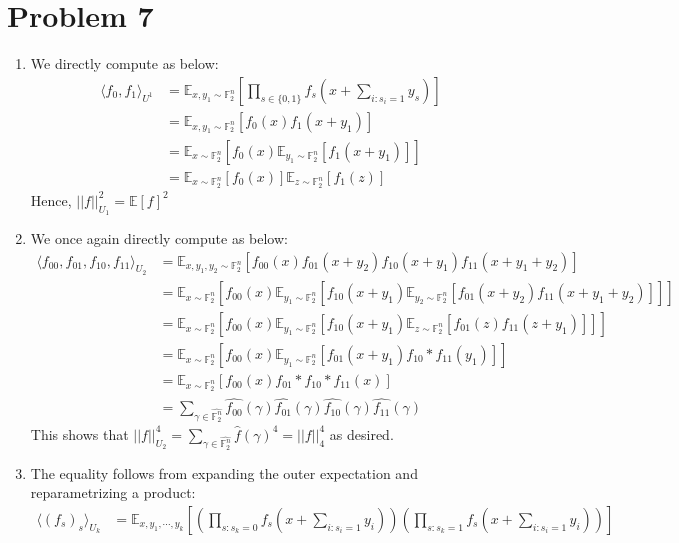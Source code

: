 \documentclass[12pt]{article}%
\newcommand{\Fn}{\mathbb{F}_2^n}
\newcommand{\Exp}[1]{\mathbb{E}_{#1}}
\begin{document}
\section*{Problem 7}
\begin{enumerate}
  \item We directly compute as below:
  \begin{align*}
    \langle f_0, f_1 \rangle_{U^1} & = \Exp{x, y_1 \sim \Fn}\left[ \prod_{s \in \{0,1\}} f_s(x + \sum_{i: s_i = 1} y_s) \right ] \\
    & = \Exp{x, y_1 \sim \Fn}\left[ f_0(x)f_1(x + y_1) \right] \\
    & = \Exp{x \sim \Fn} \left[f_0(x) \Exp{y_1 \sim \Fn} \left[f_1(x + y_1) \right]\right] \\
    & = \Exp{x \sim \Fn} \left[f_0(x) \right] \Exp{z \sim \Fn} \left[ f_1(z) \right]
  \end{align*}
  Hence, $||f||_{U_1}^2 = \mathbb{E}[f]^2$
  \item We once again directly compute as below:
  \begin{align*}
    \langle f_{00}, f_{01}, f_{10}, f_{11} \rangle_{U_2} & = \Exp{x, y_1, y_2 \sim \Fn}[f_{00}(x)f_{01}(x + y_2)f_{10}(x + y_1)f_{11}(x + y_1 + y_2)] \\
    & = \Exp{x \sim \Fn} \left[ f_{00}(x) \Exp{y_1 \sim \Fn} \left[ f_{10}(x + y_1) \Exp{y_2 \sim \Fn}\left[ f_{01}(x + y_2)f_{11}(x + y_1 + y_2)\right] \right] \right] \\
    & = \Exp{x \sim \Fn} \left[ f_{00}(x) \Exp{y_1 \sim \Fn} \left[ f_{10}(x + y_1) \Exp{z \sim \Fn}\left[ f_{01}(z)f_{11}(z + y_1)\right] \right] \right] \\
    & = \Exp{x \sim \Fn} \left[ f_{00}(x) \Exp{y_1 \sim \Fn} \left[ f_{01}(x + y_1) f_{10}*f_{11}(y_1) \right]\right] \\
    & = \Exp{x \sim \Fn} \left[ f_{00}(x)  f_{01} * f_{10}*f_{11}(x) \right] \\
    & = \sum_{\gamma \in \hat{\Fn}} \widehat{f_{00}}(\gamma)\widehat{f_{01}}(\gamma)\widehat{f_{10}}(\gamma)\widehat{f_{11}}(\gamma)
  \end{align*}
  This shows that $||f||_{U_2}^4 = \sum_{\gamma \in \hat{\Fn}} \widehat{f}(\gamma)^4 = ||f||_4^4 $ as desired.
  \item
  The equality follows from expanding the outer expectation and reparametrizing a product:
  \begin{align*}
    \langle (f_s)_s \rangle_{U_k} & = \Exp{x, y_1, \cdots, y_k} \left[ \left(\prod_{s: s_k = 0} f_s(x + \sum_{i: s_i = 1} y_i)\right) \left(\prod_{s: s_k = 1} f_s(x + \sum_{i: s_i = 1} y_i)\right) \right] \\

\end{align*}
\end{enumerate}
\end{document}

